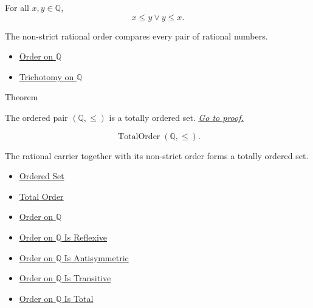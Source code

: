 \begin{remark*}
For all $x,y\in\mathbb{Q}$,
\[
x\le y\lor y\le x.
\]
\end{remark*}

\begin{remark*}[Interpretation]
The non-strict rational order compares every pair of rational numbers.
\end{remark*}

\begin{dependencies}
\begin{itemize}
  \item \hyperref[def:order-on-q]{Order on $\mathbb{Q}$}
  \item \hyperref[thm:trichotomy-on-q]{Trichotomy on $\mathbb{Q}$}
\end{itemize}
\end{dependencies}

\begin{theorembox}{Theorem}
\begin{theorem}
\label{thm:q-totally-ordered-set}
The ordered pair $(\mathbb{Q},\le)$ is a totally ordered set.
\hyperref[prf:q-totally-ordered-set]{\textit{Go to proof.}}
\end{theorem}
\end{theorembox}

\begin{remark*}
\[
\operatorname{TotalOrder}(\mathbb{Q},\le).
\]
\end{remark*}

\begin{remark*}[Interpretation]
The rational carrier together with its non-strict order forms a totally
ordered set.
\end{remark*}

\begin{dependencies}
\begin{itemize}
  \item \hyperref[def:ordered-set]{Ordered Set}
  \item \hyperref[def:total-order]{Total Order}
  \item \hyperref[def:order-on-q]{Order on $\mathbb{Q}$}
  \item \hyperref[thm:order-on-q-reflexive]{Order on $\mathbb{Q}$ Is Reflexive}
  \item \hyperref[thm:order-on-q-antisymmetric]{Order on $\mathbb{Q}$ Is Antisymmetric}
  \item \hyperref[thm:order-on-q-transitive]{Order on $\mathbb{Q}$ Is Transitive}
  \item \hyperref[thm:order-on-q-total]{Order on $\mathbb{Q}$ Is Total}
\end{itemize}
\end{dependencies}

